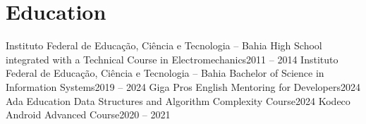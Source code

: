 \section{Education}
  \resumeSubHeadingListStart
    \resumeSubheading
      {Instituto Federal de Educação, Ciência e Tecnologia – Bahia}{}
      {High School integrated with a Technical Course in Electromechanics}{2011 -- 2014}
    \resumeSubheading
      {Instituto Federal de Educação, Ciência e Tecnologia – Bahia}{}
      {Bachelor of Science in Information Systems}{2019 -- 2024}
    \resumeSubheading
      {Giga Pros}{}
      {English Mentoring for Developers}{2024}
    \resumeSubheading
      {Ada Education}{}
      {Data Structures and Algorithm Complexity Course}{2024}
    \resumeSubheading
      {Kodeco}{}
      {Android Advanced Course}{2020 -- 2021}
  \resumeSubHeadingListEnd
